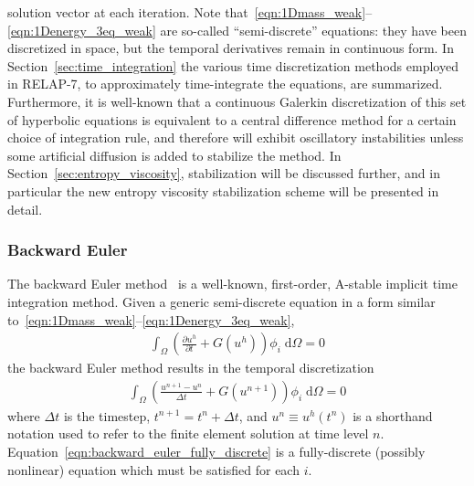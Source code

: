 solution vector at each iteration.  Note
that~\eqref{eqn:1Dmass_weak}--\eqref{eqn:1Denergy_3eq_weak} are
so-called ``semi-discrete'' equations: they have been discretized in
space, but the temporal derivatives remain in continuous form.  In
Section~\ref{sec:time_integration} the various time discretization methods
employed in RELAP-7, to approximately time-integrate the equations,
are summarized.  Furthermore, it is well-known
that a continuous Galerkin discretization of this set of hyperbolic
equations is equivalent to a central difference method for a certain
choice of integration rule, and therefore will exhibit oscillatory
instabilities unless some artificial diffusion is added to stabilize
the method.  In Section~\ref{sec:entropy_viscosity}, stabilization will be
discussed further, and in particular the new entropy viscosity 
stabilization scheme will be presented in detail.
%
\subsubsection{Backward Euler\label{sec:backward_euler}}
%
The backward Euler method~\cite{Butcher_2003} is a well-known, first-order, A-stable
implicit time integration method.  Given a generic
semi-discrete equation in a form similar to~\eqref{eqn:1Dmass_weak}--\eqref{eqn:1Denergy_3eq_weak},
\begin{align}
  \int_{\Omega} \left(\frac{\partial u^h}{\partial t} + G(u^h) \right) \phi_i \; \text{d}{\Omega} = 0
\end{align}
the backward Euler method results in the temporal discretization
\begin{align}
  \label{eqn:backward_euler_fully_discrete}
  \int_{\Omega} \left( \frac{u^{n+1} - u^n}{\Delta t} + G(u^{n+1}) \right) \phi_i \; \text{d}{\Omega} = 0
\end{align}
where $\Delta t$ is the timestep, $t^{n+1} = t^n + \Delta t$, and $u^n
\equiv u^h(t^n)$ is a shorthand notation used to refer to the finite
element solution at time level
$n$. Equation~\eqref{eqn:backward_euler_fully_discrete} is a
fully-discrete (possibly nonlinear) equation which must be satisfied
for each $i$.

